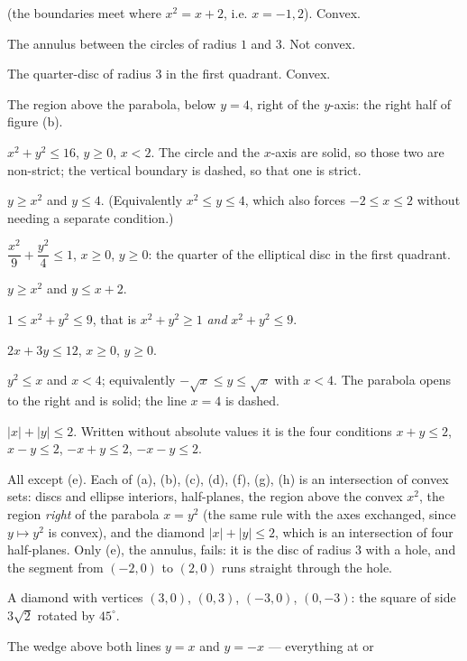 \begin{solutions}
        (the boundaries meet where $x^{2}=x+2$, i.e. $x=-1,2$). Convex.
  \item The annulus between the circles of radius $1$ and $3$. Not convex.
  \item The quarter-disc of radius $3$ in the first quadrant. Convex.
  \item The region above the parabola, below $y=4$, right of the $y$-axis:
        the right half of figure (b).
  \item $x^{2}+y^{2}\le16$, \;$y\ge0$, \;$x<2$. The circle and the
        $x$-axis are solid, so those two are non-strict; the vertical
        boundary is dashed, so that one is strict.
  \item $y\ge x^{2}$ and $y\le4$. (Equivalently
        $x^{2}\le y\le 4$, which also forces $-2\le x\le2$ without needing
        a separate condition.)
  \item $\dfrac{x^{2}}{9}+\dfrac{y^{2}}{4}\le1$, \;$x\ge0$, \;$y\ge0$: the
        quarter of the elliptical disc in the first quadrant.
  \item $y\ge x^{2}$ and $y\le x+2$.
  \item $1\le x^{2}+y^{2}\le9$, that is $x^{2}+y^{2}\ge1$ \emph{and}
        $x^{2}+y^{2}\le9$.
  \item $2x+3y\le12$, \;$x\ge0$, \;$y\ge0$.
  \item $y^{2}\le x$ and $x<4$; equivalently
        $-\sqrt{x}\le y\le\sqrt{x}$ with $x<4$. The parabola opens to the
        right and is solid; the line $x=4$ is dashed.
  \item $|x|+|y|\le2$. Written without absolute values it is the four
        conditions $x+y\le2$, $x-y\le2$, $-x+y\le2$, $-x-y\le2$.
  \item All except (e). Each of (a), (b), (c), (d), (f), (g), (h) is an
        intersection of convex sets: discs and ellipse interiors,
        half-planes, the region above the convex $x^{2}$, the region
        \emph{right} of the parabola $x=y^{2}$ (the same rule with the axes
        exchanged, since $y\mapsto y^{2}$ is convex), and the diamond
        $|x|+|y|\le2$, which is an intersection of four half-planes.
        Only (e), the annulus, fails: it is the disc of radius $3$ with a
        hole, and the segment from $(-2,0)$ to $(2,0)$ runs straight
        through the hole.
  \item A diamond with vertices $(3,0)$, $(0,3)$, $(-3,0)$, $(0,-3)$: the
        square of side $3\sqrt2$ rotated by $45^{\circ}$.
  \item The wedge above both lines $y=x$ and $y=-x$ --- everything at or

\end{solutions}
